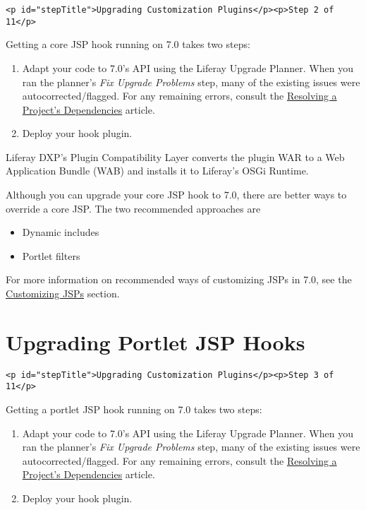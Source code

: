 \begin{verbatim}
<p id="stepTitle">Upgrading Customization Plugins</p><p>Step 2 of 11</p>
\end{verbatim}

Getting a core JSP hook running on 7.0 takes two steps:

\begin{enumerate}
\def\labelenumi{\arabic{enumi}.}
\item
  Adapt your code to 7.0's API using the Liferay Upgrade Planner. When
  you ran the planner's \emph{Fix Upgrade Problems} step, many of the
  existing issues were autocorrected/flagged. For any remaining errors,
  consult the
  \href{/docs/7-2/tutorials/-/knowledge_base/t/resolving-a-projects-dependencies}{Resolving
  a Project's Dependencies} article.
\item
  Deploy your hook plugin.
\end{enumerate}

Liferay DXP's Plugin Compatibility Layer converts the plugin WAR to a
Web Application Bundle (WAB) and installs it to Liferay's OSGi Runtime.

Although you can upgrade your core JSP hook to 7.0, there are better
ways to override a core JSP. The two recommended approaches are

\begin{itemize}
\tightlist
\item
  Dynamic includes
\item
  Portlet filters
\end{itemize}

For more information on recommended ways of customizing JSPs in 7.0, see
the
\href{/docs/7-2/customization/-/knowledge_base/c/customizing-jsps}{Customizing
JSPs} section.

\chapter{Upgrading Portlet JSP Hooks}\label{upgrading-portlet-jsp-hooks}

\begin{verbatim}
<p id="stepTitle">Upgrading Customization Plugins</p><p>Step 3 of 11</p>
\end{verbatim}

Getting a portlet JSP hook running on 7.0 takes two steps:

\begin{enumerate}
\def\labelenumi{\arabic{enumi}.}
\item
  Adapt your code to 7.0's API using the Liferay Upgrade Planner. When
  you ran the planner's \emph{Fix Upgrade Problems} step, many of the
  existing issues were autocorrected/flagged. For any remaining errors,
  consult the
  \href{/docs/7-2/tutorials/-/knowledge_base/t/resolving-a-projects-dependencies}{Resolving
  a Project's Dependencies} article.
\item
  Deploy your hook plugin.
\end{enumerate}

